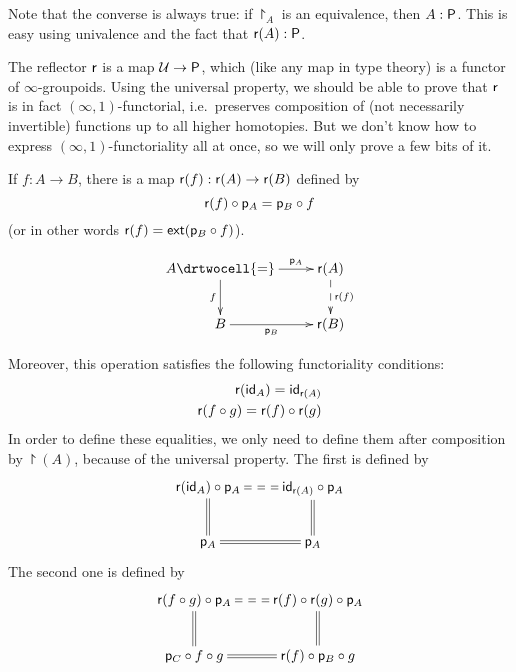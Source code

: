 Note that the converse is always true: if $\project_A$ is an equivalence, then $A:\P$.
This is easy using univalence and the fact that $\reflect(A):\P$.

The reflector $\reflect$ is a map $\type\to\P$, which (like any map in type theory) is a functor of $\infty$-groupoids.
Using the universal property, we should be able to prove that $\reflect$ is in fact $(\infty,1)$-functorial, i.e.\ preserves composition of
(not necessarily invertible) functions up to all higher homotopies.
But we don't know how to express $(\infty,1)$-functoriality all at once, so we will only prove a few bits of it.

\begin{defn}
  If $f:A\to{}B$, there is a map $\reflect(f):\reflect(A)\to\reflect(B)$ defined
  by
  \begin{equation}
    \reflect(f)\circ\project_A=\project_B\circ{}f\label{eq:project-natural}
  \end{equation}
  (or in other words $\reflect(f)=\ext(\project_B\circ{}f)$).
\end{defn}

\[\uppercurveobject{{ }}\lowercurveobject{{ }}\twocellhead{{ }}
\xymatrix{A \ar^-{\project_A}[r] \ar_-f[d] \drtwocell{=} & \reflect(A)
  \ar@{-->}^-{\reflect(f)}[d]
  \\ B \ar_-{\project_B}[r] & \reflect(B)}\]

Moreover, this operation satisfies the following functoriality conditions:
  \begin{align*}
    \reflect(\idfunc[A])=\idfunc[\reflect(A)]\\
    \reflect(f\circ{}g)=\reflect(f)\circ\reflect(g)
  \end{align*}
  In order to define these equalities, we only need to define them after
  composition by $\project(A)$, because of the universal property.
  The first is defined by
  \[\xymatrix{
    \reflect(\idfunc[A])\circ\project_A \ar@{==}[r] \ar@{=}[d] &
    \idfunc[\reflect(A)]\circ\project_A \ar@{=}[d] \\
    \project_A \ar@{=}[r] & \project_A
  }\]
  The second one is defined by
  \[\xymatrix{
    \reflect(f\circ g)\circ\project_A \ar@{==}[r] \ar@{=}[d] &
    \reflect(f)\circ\reflect(g)\circ\project_A \ar@{=}[d] \\
    \project_C\circ f\circ g \ar@{=}[r] & \reflect(f)\circ\project_B\circ g
  }\]


